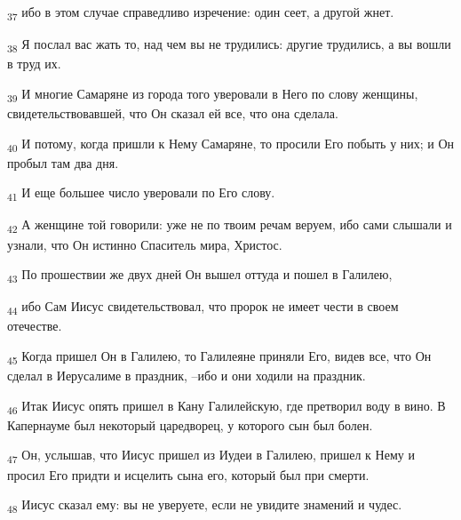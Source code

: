 \begin{tcolorbox}
\textsubscript{37} ибо в этом случае справедливо изречение: один сеет, а другой жнет.
\end{tcolorbox}
\begin{tcolorbox}
\textsubscript{38} Я послал вас жать то, над чем вы не трудились: другие трудились, а вы вошли в труд их.
\end{tcolorbox}
\begin{tcolorbox}
\textsubscript{39} И многие Самаряне из города того уверовали в Него по слову женщины, свидетельствовавшей, что Он сказал ей все, что она сделала.
\end{tcolorbox}
\begin{tcolorbox}
\textsubscript{40} И потому, когда пришли к Нему Самаряне, то просили Его побыть у них; и Он пробыл там два дня.
\end{tcolorbox}
\begin{tcolorbox}
\textsubscript{41} И еще большее число уверовали по Его слову.
\end{tcolorbox}
\begin{tcolorbox}
\textsubscript{42} А женщине той говорили: уже не по твоим речам веруем, ибо сами слышали и узнали, что Он истинно Спаситель мира, Христос.
\end{tcolorbox}
\begin{tcolorbox}
\textsubscript{43} По прошествии же двух дней Он вышел оттуда и пошел в Галилею,
\end{tcolorbox}
\begin{tcolorbox}
\textsubscript{44} ибо Сам Иисус свидетельствовал, что пророк не имеет чести в своем отечестве.
\end{tcolorbox}
\begin{tcolorbox}
\textsubscript{45} Когда пришел Он в Галилею, то Галилеяне приняли Его, видев все, что Он сделал в Иерусалиме в праздник, --ибо и они ходили на праздник.
\end{tcolorbox}
\begin{tcolorbox}
\textsubscript{46} Итак Иисус опять пришел в Кану Галилейскую, где претворил воду в вино. В Капернауме был некоторый царедворец, у которого сын был болен.
\end{tcolorbox}
\begin{tcolorbox}
\textsubscript{47} Он, услышав, что Иисус пришел из Иудеи в Галилею, пришел к Нему и просил Его придти и исцелить сына его, который был при смерти.
\end{tcolorbox}
\begin{tcolorbox}
\textsubscript{48} Иисус сказал ему: вы не уверуете, если не увидите знамений и чудес.
\end{tcolorbox}
